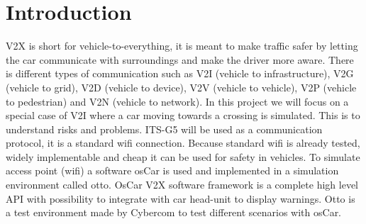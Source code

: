 \newpage
\section{Introduction}
V2X is short for vehicle-to-everything, it is meant to make traffic safer by letting the car communicate with surroundings and make the driver more aware. There is different types of communication such as V2I (vehicle to infrastructure), V2G (vehicle to grid), V2D (vehicle to device), V2V (vehicle to vehicle), V2P (vehicle to pedestrian) and V2N (vehicle to network). In this project we will focus on a special case of V2I where a car moving towards a crossing is simulated. This is to understand risks and problems. ITS-G5 will be used as a communication protocol, it is a standard wifi connection. Because standard wifi is already tested, widely implementable and cheap it can be used for safety in vehicles. To simulate access point (wifi) a software osCar is used and implemented in a simulation environment called otto. OsCar V2X software framework is a complete high level API with possibility to integrate with car head-unit to display warnings. Otto is a test environment made by Cybercom to test different scenarios with osCar. 